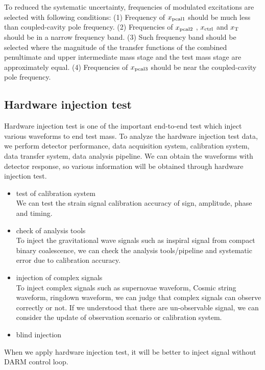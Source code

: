To reduced the systematic uncertainty, frequencies of modulated excitations are selected with following conditions:
(1) Frequency of $x_{\rm pcal1}$ should be much less than coupled-cavity pole frequency.
(2) Frequencies of $x_{\rm pcal2}$ , $x_{\rm ctrl}$ and $x_{\rm T}$ should be in a narrow frequency band.
(3) Such frequency band should be selected where the magnitude of the transfer functions of 
the combined penultimate and upper intermediate mass stage and the test mass stage are 
approximately equal.
(4) Frequencies of $x_{\rm pcal3}$ should be near the coupled-cavity pole frequency.


\subsection{Hardware injection test}
Hardware injection test is one of the important end-to-end test which 
inject various waveforms to end test mass.
To analyze the hardware injection test data, we perform 
detector performance, data acquisition system, calibration system, 
data transfer system, data analysis pipeline.
We can obtain the waveforms with detector response, so 
various information will be obtained through hardware injection test.
\begin{itemize}
\item test of calibration system\\
We can test the strain signal calibration accuracy of 
sign, amplitude, phase and timing.
\item check of analysis tools\\
To inject the gravitational wave signals such as inspiral signal from 
compact binary coalescence, we can check the analysis tools/pipeline 
and systematic error due to calibration accuracy.
\item injection of complex signals\\
To inject complex signals such as supernovae waveform, Cosmic string waveform, ringdown waveform, 
we can judge that complex signals can observe correctly or not. 
If we understood that there are un-observable signal, we can consider the update of observation scenario or
calibration system.
\item blind injection\\
\end{itemize}
When we apply hardware injection test, it will be better to inject signal without DARM control loop.
